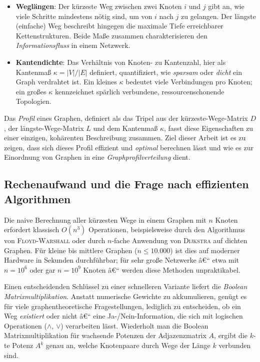 ﻿\documentclass[a4paper,12pt]{article}
\theoremstyle{definition}
\begin{document}
	\begin{itemize}
		\item[-] \textbf{Weglängen}: Der kürzeste Weg zwischen zwei Knoten $i$ und $j$ gibt an, wie viele Schritte mindestens nötig sind, um von $i$ nach $j$ zu gelangen. Der längste (einfache) Weg beschreibt hingegen die maximale Tiefe erreichbarer Kettenstrukturen. Beide Maße zusammen charakterisieren den \emph{Informationsfluss} in einem Netzwerk.
		\item[-] \textbf{Kantendichte}: Das Verhältnis von Knoten- zu Kantenzahl, hier als Kantenmaß $\kappa = |V| / |E|$ definiert, quantifiziert, wie \emph{sparsam} oder \emph{dicht} ein Graph verdrahtet ist. Ein kleines $\kappa$ bedeutet viele Verbindungen pro Knoten; ein großes $\kappa$ kennzeichnet spärlich verbundene, ressourcenschonende Topologien.
	\end{itemize}

	Das \emph{Profil} eines Graphen, definiert als das Tripel aus der kürzeste-Wege-Matrix $D$, der längste-Wege-Matrix $L$ und dem Kantenmaß $\kappa$, fasst diese Eigenschaften zu einer einzigen, kohärenten Beschreibung zusammen. Ziel dieser Arbeit ist es zu zeigen, dass sich dieses Profil effizient und \emph{optimal} berechnen lässt und wie es zur Einordnung von Graphen in eine \emph{Graphprofilverteilung} dient.

	\subsection{Rechenaufwand und die Frage nach effizienten Algorithmen}

	Die naive Berechnung aller kürzesten Wege in einem Graphen mit $n$ Knoten erfordert klassisch $O(n^3)$ Operationen, beispielsweise durch den Algorithmus von \textsc{Floyd-Warshall} oder durch $n$-fache Anwendung von \textsc{Dijkstra} auf dichten Graphen. Für kleine bis mittlere Graphen ($n \leq 10{.}000$) ist dies auf moderner Hardware in Sekunden durchführbar; für sehr große Netzwerke â€“ etwa mit $n = 10^6$ oder gar $n = 10^9$ Knoten â€“ werden diese Methoden unpraktikabel.

	Einen entscheidenden Schlüssel zu einer schnelleren Variante liefert die \emph{Boolean Matrixmultiplikation}. Anstatt numerische Gewichte zu akkumulieren, genügt es für viele graphentheoretische Fragestellungen, lediglich zu entscheiden, ob ein Weg \emph{existiert} oder nicht â€“ eine Ja-/Nein-Information, die sich mit logischen Operationen ($\wedge$, $\vee$) verarbeiten lässt. Wiederholt man die Boolean Matrixmultiplikation für wachsende Potenzen der Adjazenzmatrix $A$, ergibt die $k$-te Potenz $A^k$ genau an, welche Knotenpaare durch Wege der Länge $k$ verbunden sind.
\end{document}
